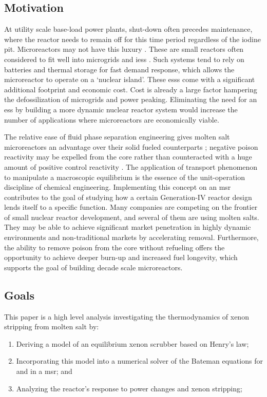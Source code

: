 \subsection{Motivation}
At utility scale base-load power plants, shut-down often precedes maintenance, where the reactor needs to remain off for this time period regardless of the iodine pit. Microreactors may not have this luxury \cite{micro}. These are small reactors often considered to fit well into microgrids \cite{BikashMicro} and \acfp{ies} \cite{AmeyIES}. Such systems tend to rely on batteries and thermal storage for fast demand response, which allows the microreactor to operate on a `nuclear island'. These \acfp{ess} come with a significant additional footprint and economic cost. Cost is already a large factor hampering the defossilization of microgrids and power peaking. Eliminating the need for an \acs{ess} by building a more dynamic nuclear reactor system would increase the number of applications where microreactors are economically viable.
 
The relative ease of fluid phase separation engineering gives molten salt microreactors an advantage over their solid fueled counterparts \cite{CarterPHD,PetersonMS}; negative poison reactivity may be expelled from the core rather than counteracted with a huge amount of positive control reactivity \cite{ORNL-xenonbehavior}. The application of transport phenomenon to manipulate a macroscopic equilibrium is the essence of the unit-operation discipline of chemical engineering. Implementing this concept on an \acs{msr} contributes to the goal of studying how a certain Generation-IV reactor design lends itself to a specific function. Many companies are competing on the frontier of small nuclear reactor development, and several of them are using molten salts. They may be able to achieve significant market penetration in highly dynamic environments and non-traditional markets by accelerating \Xe removal. Furthermore, the ability to remove poison from the core without refueling offers the opportunity to achieve deeper burn-up and increased fuel longevity, which supports the goal of building decade scale microreactors. 

\subsection{Goals}
This paper is a high level analysis investigating the thermodynamics of xenon stripping from molten salt by:
\begin{enumerate}[topsep=3pt,itemsep=-0.75ex,partopsep=1ex,parsep=1ex,label=(\arabic*)]
    \item Deriving a model of an equilibrium xenon scrubber based on Henry's law;
    \item Incorporating this model into a numerical solver of the Bateman equations for \I and \Xe in a \acs{msr}; and 
    \item Analyzing the reactor's response to power changes and xenon stripping; 
\end{enumerate}


